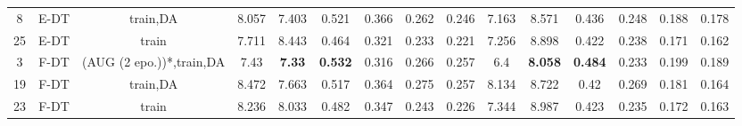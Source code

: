 \begin{table}
\begin{tabular}{@{\hskip3pt}c@{\hskip3pt}c@{\hskip3pt}c@{\hskip3pt}c@{\hskip3pt}c@{\hskip3pt}c@{\hskip3pt}c@{\hskip3pt}c@{\hskip3pt}c@{\hskip3pt}c@{\hskip3pt}c@{\hskip3pt}c@{\hskip3pt}c@{\hskip3pt}c@{\hskip3pt}c}
          8 &           E-DT &                  train,DA &             8.057 &          7.403 &           0.521 &           0.366 &           0.262 &           0.246 &               7.163 &           8.571 &           0.436 &           0.248 &          0.188 &           0.178 \\
         25 &           E-DT &                     train &             7.711 &          8.443 &           0.464 &           0.321 &           0.233 &           0.221 &               7.256 &           8.898 &           0.422 &           0.238 &          0.171 &           0.162 \\
          3 &           F-DT &  (AUG (2 epo.))*,train,DA &              7.43 &  \textbf{7.33} &  \textbf{0.532} &           0.316 &           0.266 &           0.257 &                 6.4 &  \textbf{8.058} &  \textbf{0.484} &           0.233 &          0.199 &           0.189 \\
         19 &           F-DT &                  train,DA &             8.472 &          7.663 &           0.517 &           0.364 &           0.275 &           0.257 &               8.134 &           8.722 &            0.42 &           0.269 &          0.181 &           0.164 \\
         23 &           F-DT &                     train &             8.236 &          8.033 &           0.482 &           0.347 &           0.243 &           0.226 &               7.344 &           8.987 &           0.423 &           0.235 &          0.172 &           0.163 \\
\bottomrule
\end{tabular}
\end{table}

